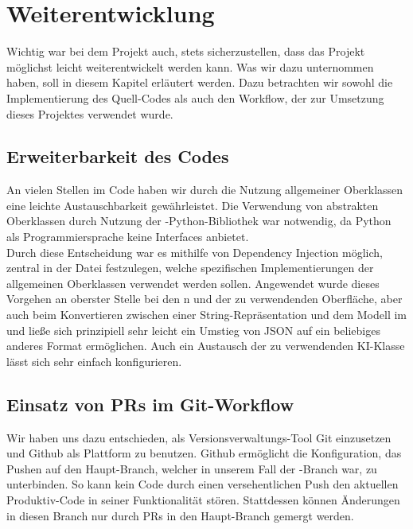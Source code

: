 \chapter{Weiterentwicklung}
\label{ch:weiterentwicklung}

Wichtig war bei dem Projekt auch, stets sicherzustellen, dass das Projekt möglichst leicht weiterentwickelt werden kann.
Was wir dazu unternommen haben, soll in diesem Kapitel erläutert werden.
Dazu betrachten wir sowohl die Implementierung des Quell-Codes als auch den Workflow, der zur Umsetzung dieses Projektes
verwendet wurde.

\section{Erweiterbarkeit des Codes}
\label{sec:erweiterbarkeit}

An vielen Stellen im Code haben wir durch die Nutzung allgemeiner Oberklassen eine leichte Austauschbarkeit
gewährleistet.
Die Verwendung von abstrakten Oberklassen durch Nutzung der -Python-Bibliothek war notwendig, da Python
als Programmiersprache keine Interfaces anbietet. \\

Durch diese Entscheidung war es mithilfe von Dependency Injection möglich, zentral in der Datei 
festzulegen, welche spezifischen Implementierungen der allgemeinen Oberklassen verwendet werden sollen.
Angewendet wurde dieses Vorgehen an oberster Stelle bei den n und der zu verwendenden Oberfläche, aber
auch beim Konvertieren zwischen einer String-Repräsentation und dem Modell im  und 
ließe sich prinzipiell sehr leicht ein Umstieg von JSON auf ein beliebiges anderes Format ermöglichen.
Auch ein Austausch der zu verwendenden \ac{KI}-Klasse lässt sich sehr einfach konfigurieren.

\section{Einsatz von PRs im Git-Workflow}
\label{sec:git-workflow}

Wir haben uns dazu entschieden, als Versionsverwaltungs-Tool Git einzusetzen und Github als Plattform zu benutzen.
Github ermöglicht die Konfiguration, das Pushen auf den Haupt-Branch, welcher in unserem Fall der -Branch war,
zu unterbinden.
So kann kein Code durch einen versehentlichen Push den aktuellen Produktiv-Code in seiner Funktionalität stören.
Stattdessen können Änderungen in diesen Branch nur durch \ac{PR}s in den Haupt-Branch gemergt werden. \\

